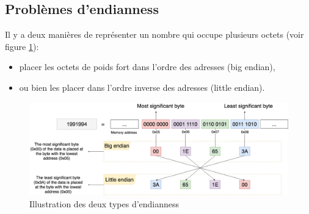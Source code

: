 \documentclass[a4paper]{article}
\begin{document}
\subsection{Problèmes d'endianness} \label{subsec:probendianness}



Il y a deux manières de représenter un nombre qui occupe plusieurs octets (voir figure \ref{fig:endianness}):
\begin{itemize}
    \item placer les octets de poids fort dans l'ordre des adresses (big endian),
    \item ou bien les placer dans l'ordre inverse des adresses (little endian).
\end{itemize}
\begin{figure}[H]
    \centering
    \includegraphics[width=0.90\linewidth]{images/Endian-Overview.png}
    \caption{Illustration des deux types d'endianness \cite{7}}
    \label{fig:endianness}
\end{figure}
\end{document}
